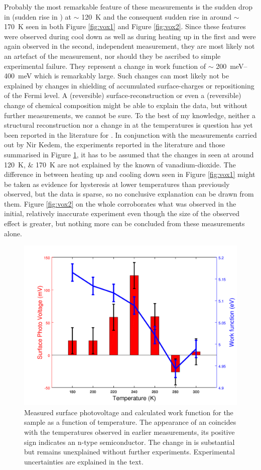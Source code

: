 Probably the most remarkable feature of these measurements is the sudden drop in \cpd{} (sudden rise in \wf{}) at $\sim$ \SI{120}{\kelvin} and the consequent sudden rise in \cpd{} around $\sim$ \SI{170}{\kelvin} seen in both Figure \ref{fig:vox1} and Figure \ref{fig:vox2}. Since these features were observed during cool down as well as during heating up in the first and were again observed in the second, independent measurement, they are most likely not an artefact of the measurement, nor should they be ascribed to simple experimental failure. They represent a change in work function of $\sim$ \SIrange{200}{400}{\milli\electronvolt} which is remarkably large. Such changes can most likely not be explained by changes in shielding of accumulated surface-charges or repositioning of the Fermi level. A (reversible) surface-reconstruction or even a (reversible) change of chemical composition might be able to explain the data, but without further measurements, we cannot be sure. To the best of my knowledge, neither a structural reconstruction nor a change in \wf{} at the temperatures is question has yet been reported in the literature for \wvadiox{}. In conjunction with the measurements carried out by Nir Kedem, the experiments reported in the literature and those summarised in Figure \ref{fig:vox3}, it has to be assumed that the changes in \wf{} seen at around \SIlist{120;170}{\kelvin} are not explained by the known \mit{} of vanadium-dioxide. The difference in \cpd{} between heating up and cooling down seen in Figure \ref{fig:vox1} might be taken as evidence for hysteresis at lower temperatures than previously observed, but the data is sparse, so no conclusive explanation can be drawn from them. Figure \ref{fig:vox2} on the whole corroborates what was observed in the initial, relatively inaccurate experiment even though the size of the observed effect is greater, but nothing more can be concluded from these measurements alone.\\
\begin{figure}
\centering
	\includegraphics[width=0.8\linewidth]{./figs/chap2/vox3}
	\caption{Measured surface photovoltage and calculated work function for the \wvadiox{} sample as a function of temperature. The appearance of an \spv{} coincides with the \mit{} temperatures observed in earlier measurements, its positive sign indicates an n-type semiconductor. The change in \wf{} is substantial but remains unexplained without further experiments. Experimental uncertainties are explained in the text.}
	\label{fig:vox3}
\end{figure}
